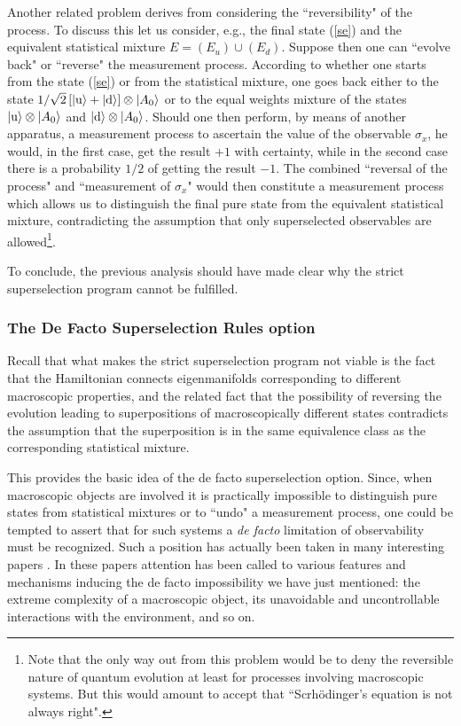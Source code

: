 \documentclass[10pt,a4paper]{article}
\begin{document}
Another related problem derives from considering the
``reversibility" of the process. To discuss this let us consider,
e.g., the final state (\ref{se}) and the equivalent statistical
mixture $E=(E_{u})\cup (E_{d})$. Suppose then one can ``evolve
back" or ``reverse" the measurement process. According to whether
one starts from the state (\ref{se}) or from the statistical
mixture, one goes back either to the state
$1/\sqrt{2}\,[|\makebox{u}\rangle +
|\makebox{d}\rangle]\otimes|A_{0}\rangle$ or to the equal weights
mixture of the states $|\makebox{u}\rangle\otimes |A_{0}\rangle$
and $|\makebox{d}\rangle\otimes |A_{0}\rangle$. Should one then
perform, by means of another apparatus, a measurement process to
ascertain the value of the observable $\sigma_{x}$, he would, in
the first case, get the result $+1$ with certainty, while in the
second case there is a probability $1/2$ of getting the result
$-1$. The combined ``reversal of the process" and ``measurement of
$\sigma_{x}$" would then constitute a measurement process which
allows us to distinguish the final pure state from the equivalent
statistical mixture, contradicting the assumption that only
superselected observables are allowed\footnote {Note that the only way
out from this problem would be to deny the reversible nature of quantum
evolution at least for processes involving macroscopic systems. But this
would amount to accept that \cite{bells} ``Scrh\"{o}dinger's equation
is not always right".}.

To conclude, the previous analysis should have made clear why the
strict superselection  program cannot be fulfilled.


\subsubsection{The De Facto Superselection Rules option}
\label{sec332}

Recall that what makes the strict superselection program not
viable is the fact that the Hamiltonian connects eigenmanifolds
corresponding to different macroscopic properties, and the related
fact that the possibility of reversing the evolution leading to
superpositions of macroscopically different states contradicts the
assumption that the superposition is in the same equivalence class
as the corresponding statistical mixture.

This provides the basic idea of the de facto superselection
option. Since, when macroscopic objects are involved it is
practically impossible to distinguish pure states from statistical
mixtures or to ``undo" a measurement process, one could be tempted
to assert that for such systems a {\it de facto} limitation of
observability must be recognized. Such a position has actually
been taken in many interesting papers \cite{dlp,got,zur1,zu,jz}.
In these papers attention has been called to various features and
mechanisms inducing the de facto impossibility we have just
mentioned: the extreme complexity of a macroscopic object, its
unavoidable and uncontrollable interactions with the environment,
and so on.
\end{document}
